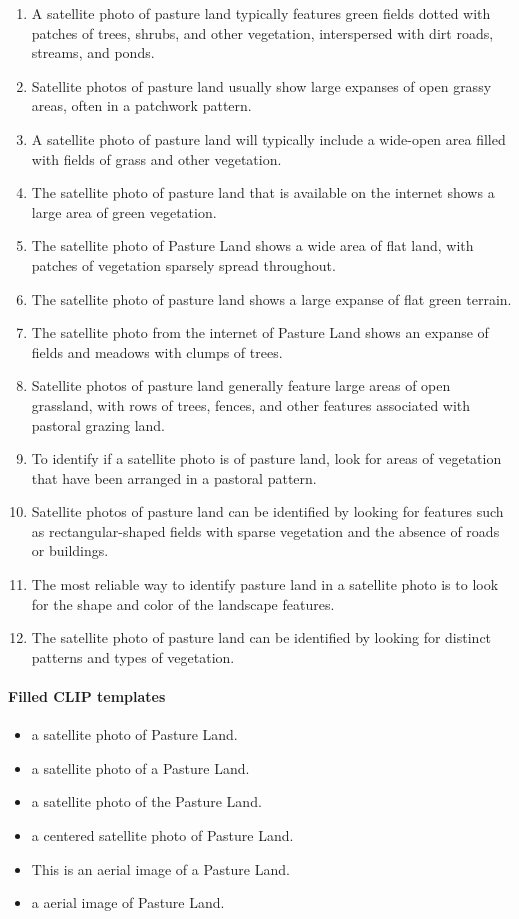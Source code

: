 \documentclass[11pt]{article}
\begin{document}
\begin{enumerate}
\item A satellite photo of pasture land typically features green fields dotted with patches of trees, shrubs, and other vegetation, interspersed with dirt roads, streams, and ponds.
\item Satellite photos of pasture land usually show large expanses of open grassy areas, often in a patchwork pattern.
\item A satellite photo of pasture land will typically include a wide-open area filled with fields of grass and other vegetation.
\item The satellite photo of pasture land that is available on the internet shows a large area of green vegetation.
\item The satellite photo of Pasture Land shows a wide area of flat land, with patches of vegetation sparsely spread throughout.
\item The satellite photo of pasture land shows a large expanse of flat green terrain.
\item The satellite photo from the internet of Pasture Land shows an expanse of fields and meadows with clumps of trees.
\item Satellite photos of pasture land generally feature large areas of open grassland, with rows of trees, fences, and other features associated with pastoral grazing land.
\item To identify if a satellite photo is of pasture land, look for areas of vegetation that have been arranged in a pastoral pattern.
\item Satellite photos of pasture land can be identified by looking for features such as rectangular-shaped fields with sparse vegetation and the absence of roads or buildings.
\item The most reliable way to identify pasture land in a satellite photo is to look for the shape and color of the landscape features.
\item The satellite photo of pasture land can be identified by looking for distinct patterns and types of vegetation.
\end{enumerate}
\paragraph{Filled CLIP templates}\begin{itemize}
\item a satellite photo of Pasture Land.
\item a satellite photo of a Pasture Land.
\item a satellite photo of the Pasture Land.
\item a centered satellite photo of Pasture Land.
\item This is an aerial image of a Pasture Land.
\item a aerial image of Pasture Land.
\end{itemize}
\end{document}
